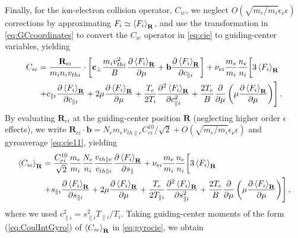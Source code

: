 {{Finally, for the ion-electron collision operator, $C_{ie}$, we neglect $O(\sqrt{m_e/m_i}\epsilon_\nu \epsilon)$ corrections by approximating $F_i \simeq \left< F_i \right>_{\mathbf R}$, and use the transformation in \cref{eq:GCcoordinates} to convert the $C_{ie}$ operator in \cref{eq:cie} to guiding-center variables, yielding
%
\begin{align}
    C_{ie} &= \frac{\mathbf R_{ei}}{m_i n_i v_{th i }}\cdot\left[\mathbf c_\perp \frac{m_i v_{thi}^2}{B}\frac{\partial \left< F_i \right>_{\mathbf R}}{\partial \mu}+\mathbf b \frac{\partial \left< F_i \right>_{\mathbf R}}{\partial c_{\parallel i}}\right]+\nu_{ei}\frac{m_e}{m_i}\frac{n_e}{n_i}\bigg[3 \left< F_i \right>_{\mathbf R}\nonumber\\
    &\left. + c_{\parallel i} \frac{\partial \left< F_i \right>_{\mathbf R}}{\partial c_{\parallel i}} +2\mu \frac{\partial \left< F_i \right>_{\mathbf R}}{\partial \mu}+ \frac{T_e}{2T_i}\frac{\partial^2 \left< F_i \right>_{\mathbf R}}{\partial c_{\parallel i }^2}+\frac{2 T_e}{B} \frac{\partial}{\partial \mu}\left(\mu \frac{\partial \left< F_i \right>_{\mathbf R}}{\partial \mu}\right)\right].
    \label{eq:cie11}
\end{align}
%
By evaluating $\mathbf R_{ei}$ at the guiding-center position $\mathbf R$ (neglecting higher order $\epsilon$ effects), we write $\mathbf R_{ei} \cdot \mathbf b = N_e m_e v_{th\parallel e} C_{ei}^{10}/\sqrt{2} + O(\sqrt{m_e/m_i}\epsilon_\nu \epsilon)$ and gyroaverage \cref{eq:cie11}, yielding
%
\begin{equation}
    \begin{split}
        \left< C_{ie} \right>_{\mathbf R}&=\frac{C_{ei}^{10}}{\sqrt{2}}\frac{m_e}{m_i} \frac{N_e}{n_i} \frac{v_{th\parallel e}}{v_{th\parallel i}} \frac{\partial \left< F_i\right>_{\mathbf R} }{\partial s_{\parallel}}+\nu_{ei}\frac{m_e}{m_i}\frac{n_e}{n_i}\bigg[3 \left< F_i \right>_{\mathbf R}\\
        &\left.+ s_{\parallel i} \frac{\partial \left< F_i \right>_{\mathbf R}}{\partial s_{\parallel i}}+2\mu \frac{\partial \left< F_i \right>_{\mathbf R}}{\partial \mu}+ \frac{T_e}{2 T_{\parallel i}}\frac{\partial^2 \left< F_i \right>_{\mathbf R}}{\partial s_{\parallel i}^2} +\frac{2 T_e }{B}\frac{\partial}{\partial \mu}\left(\mu \frac{\partial \left< F_i \right>_{\mathbf R}}{\partial \mu}\right) \right],
    \end{split}
    \label{eq:gyrocie}
\end{equation}
%
where we used $c_{\parallel i}^2 = s_{\parallel i}^2 T_{\parallel i}/T_{i}$.
Taking guiding-center moments of the form (\ref{eq:CoulIntGyro}) of $\left< C_{ie} \right>_{\mathbf R}$ in \cref{eq:gyrocie}, we obtain
}}
